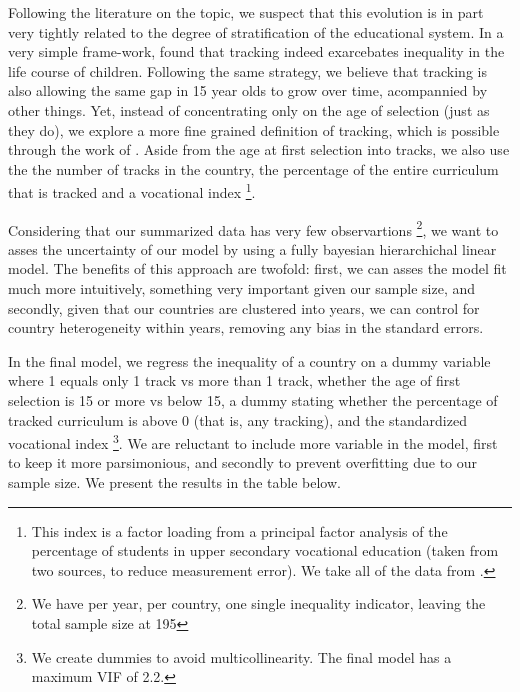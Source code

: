 \documentclass[11pt, a4paper]{article}\usepackage[]{graphicx}\usepackage[]{color}
\begin{document}
Following the literature on the topic, we suspect that this evolution is in part very tightly related to the degree of stratification of the educational system. In a very simple frame-work, \citet{hanushek_woesmann_tracking} found that tracking indeed exarcebates inequality in the life course of children. Following the same strategy, we believe that tracking is also allowing the same gap in 15 year olds to grow over time, acompannied by other things. Yet, instead of concentrating only on the age of selection (just as they do), we explore a more fine grained definition of tracking, which is possible through the work of \citet{bol2013}. Aside from the age at first selection into tracks, we also use the the number of tracks in the country, the percentage of the entire curriculum that is tracked and a vocational index \footnote{This index is a factor loading from a principal factor analysis of the percentage of students in upper secondary vocational education (taken from two sources, to reduce measurement error). We take all of the data from \citet{bol2013}.}.

Considering that our summarized data has very few observartions \footnote{We have per year, per country, one single inequality indicator, leaving the total sample size at 195}, we want to asses the uncertainty of our model by using a fully bayesian hierarchichal linear model. The benefits of this approach are twofold: first, we can asses the model fit much more intuitively, something very important given our sample size, and secondly, given that our countries are clustered into years, we can control for country heterogeneity within years, removing any bias in the standard errors.

In the final model, we regress the inequality of a country on a dummy variable where 1 equals only 1 track vs more than 1 track, whether the age of first selection is 15 or more vs below 15, a dummy stating whether the percentage of tracked curriculum is above 0 (that is, any tracking), and the standardized vocational index \footnote{We create dummies to avoid multicollinearity. The final model has a maximum VIF of 2.2.}. We are reluctant to include more variable in the model, first to keep it more parsimonious, and secondly to prevent overfitting due to our sample size. We present the results in the table below.
\end{document}
